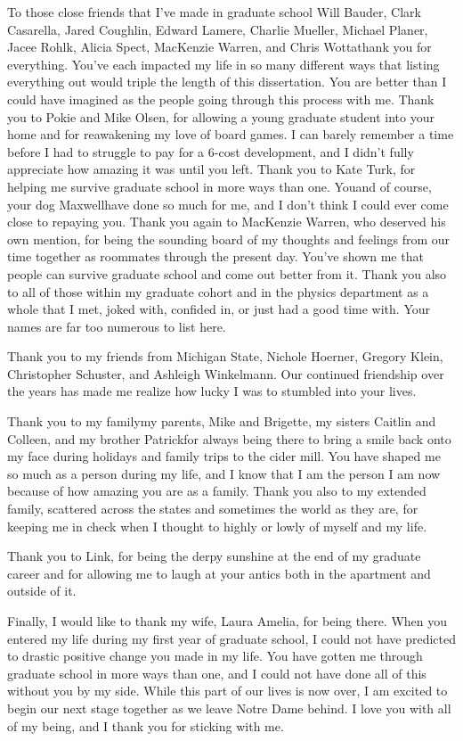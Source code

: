 \begin{acknowledge}
To those close friends that I've made in graduate school\textemdash{}
Will Bauder,
Clark Casarella,
Jared Coughlin,
Edward Lamere,
Charlie Mueller,
Michael Planer,
Jacee Rohlk,
Alicia Spect,
MacKenzie Warren,
and Chris Wotta\textemdash{}thank you for everything. You've each impacted my
life in so
many different ways that listing everything out would triple the length of this
dissertation. You are better than I could have imagined as the people going
through this process with me.
Thank you to Pokie and Mike Olsen, for allowing a young graduate student into
your home and for reawakening my love of board games. I can barely remember a
time before I had to struggle to pay for a 6-cost development, and I didn't
fully appreciate how amazing it was until you left.
Thank you to Kate Turk, for helping me survive graduate school in more ways
than one. You\textemdash{}and of course, your dog Maxwell\textemdash{}have done
so much for me, and I don't think I could ever come close to repaying you.
Thank you again to MacKenzie Warren, who deserved his own mention, for being
the sounding board of my thoughts and feelings
from our time together as roommates through the present day. You've shown me
that people can survive graduate school and come out better from it.
Thank you also to all of those within my graduate cohort and in the physics
department as a whole that I met, joked with, confided in, or just had a good
time with. Your names are far too numerous to list here.

Thank you to my friends from Michigan State, Nichole Hoerner, Gregory Klein,
Christopher Schuster, and Ashleigh Winkelmann. Our continued friendship over
the years has made me realize how lucky I was to stumbled into your lives.

Thank you to my family\textemdash{}my parents, Mike and Brigette, my sisters
Caitlin and Colleen, and my brother Patrick\textemdash{}for always being there
to bring a smile back onto my face during holidays and family trips to the
cider mill. You have shaped me so much as a person during my life, and I know
that I am the person I am now because of how amazing you are as a family.
Thank you also to my extended family, scattered across the states and sometimes
the world as they are, for keeping me in check when I thought to highly or
lowly of myself and my life.

Thank you to Link, for being the derpy sunshine at the end of my graduate
career and for allowing me to laugh at your antics both in the apartment and
outside of it.

Finally, I would like to thank my wife, Laura Amelia, for being there. When you
entered my life during my first year of graduate school, I could not have
predicted to drastic positive change you made in my life. You have gotten me
through graduate school in more ways than one, and I could not have done all of
this without you by my side. While this part of our lives is now over, I am
excited to begin our next stage together as we leave Notre Dame behind. I love
you with all of my being, and I thank you for sticking with me.

\end{acknowledge}
